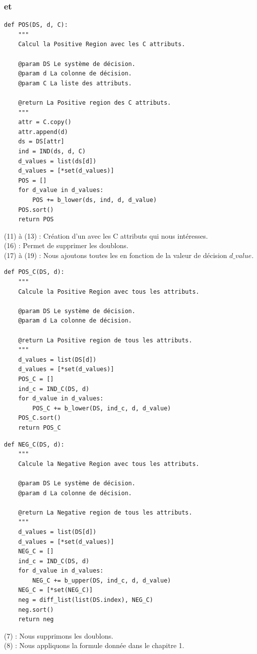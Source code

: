 \subsubsection{\posreg et \negreg}
\begin{lstlisting}
def POS(DS, d, C):
	"""
	Calcul la Positive Region avec les C attributs.

	@param DS Le système de décision.
	@param d La colonne de décision.
	@param C La liste des attributs.

	@return La Positive region des C attributs.
	"""
	attr = C.copy()
	attr.append(d)
	ds = DS[attr]
	ind = IND(ds, d, C)
	d_values = list(ds[d])
	d_values = [*set(d_values)]
	POS = []
	for d_value in d_values:
		POS += b_lower(ds, ind, d, d_value)
	POS.sort()
	return POS
\end{lstlisting}
(11) à (13) : Création d'un \df avec les C attributs qui nous
intéresses.\\
(16) : Permet de supprimer les doublons. \\
(17) à (19) : Nous ajoutons toutes les \blower en fonction de la valeur
de décision $d\_value$. \\
\newpage
\begin{lstlisting}
def POS_C(DS, d):
	"""
	Calcule la Positive Region avec tous les attributs.

	@param DS Le système de décision.
	@param d La colonne de décision.

	@return La Positive region de tous les attributs.
	"""
	d_values = list(DS[d])
	d_values = [*set(d_values)]
	POS_C = []
	ind_c = IND_C(DS, d)
	for d_value in d_values:
		POS_C += b_lower(DS, ind_c, d, d_value)
	POS_C.sort()
	return POS_C
\end{lstlisting}
\begin{lstlisting}
def NEG_C(DS, d):
	"""
	Calcule la Negative Region avec tous les attributs.

	@param DS Le système de décision.
	@param d La colonne de décision.

	@return La Negative region de tous les attributs.
	"""
	d_values = list(DS[d])
	d_values = [*set(d_values)]
	NEG_C = []
	ind_c = IND_C(DS, d)
	for d_value in d_values:
		NEG_C += b_upper(DS, ind_c, d, d_value)
	NEG_C = [*set(NEG_C)]
	neg = diff_list(list(DS.index), NEG_C)
	neg.sort()
	return neg
\end{lstlisting}
(7) : Nous supprimons les doublons. \\
(8) : Nous appliquons la formule donnée dans le chapitre 1. \\
\newpage

